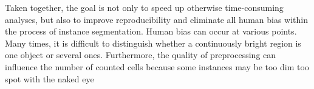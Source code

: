 Taken together, the goal is not only to speed up otherwise time-consuming analyses, but also to improve reproducibility and eliminate all human bias within the process of instance segmentation. Human bias can occur at various points. Many times, it is difficult to distinguish whether a continuously bright region is one object or several ones. Furthermore, the quality of preprocessing can influence the number of counted cells because some instances may be too dim too spot with the naked eye
